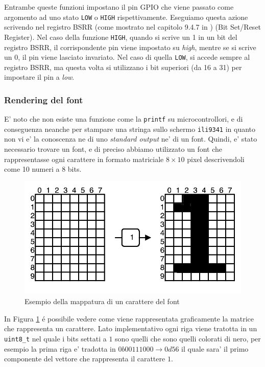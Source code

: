 \documentclass[a4paper]{article}
\begin{document}
Entrambe queste funzioni impostano il pin GPIO che viene passato come argomento ad uno stato \texttt{LOW} o \texttt{HIGH} rispettivamente.  Eseguiamo questa azione scrivendo nel registro BSRR (come mostrato nel capitolo 9.4.7 in \cite{STM32F334xx}) (Bit Set/Reset Register). Nel caso della funzione \texttt{HIGH}, quando si scrive un 1 in un bit del registro BSRR, il corrispondente pin viene impostato su \textit{high}, mentre se si scrive un 0, il pin viene lasciato invariato. Nel caso di quella \texttt{LOW}, si accede sempre al registro BSRR, ma questa volta si utilizzano i bit superiori (da 16 a 31) per impostare il pin a \textit{low}.

\subsubsection{Rendering del font}

E' noto che non esiste una funzione come la \texttt{printf} su microcontrollori, e di conseguenza neanche per stampare una stringa sullo schermo \texttt{ili9341} in quanto non vi e' la conoscenza ne di uno \textit{standard output} ne' di un font. Quindi, e' stato necessario trovare un font, e di preciso abbiamo utilizzato un font che rappresentasse ogni carattere in formato matriciale $8 \times 10$ pixel descrivendoli come 10 numeri a 8 bits.

\begin{figure}[h!t]
    \begin{center}
        \includegraphics[scale=0.5]{./figures/matrix_font.pdf}
    \end{center}
    \caption{Esempio della mappatura di un carattere del font}
    \label{fig:matrix_font}
\end{figure}

In Figura \ref{fig:matrix_font} é possibile vedere come viene rappresentata graficamente la matrice che rappresenta un carattere. Lato implementativo ogni riga viene tratotta in un \texttt{uint8\_t} nel quale i bits settati a $1$ sono quelli che sono quelli colorati di nero, per esempio la prima riga e' tradotta in $0b00111000 \rightarrow 0d56$ il quale sara' il primo componente del vettore che rappresenta il carattere $1$.
\end{document}
